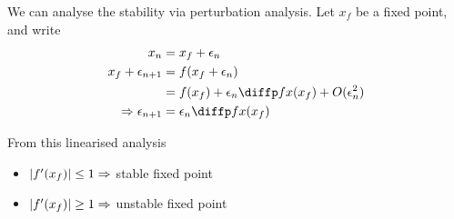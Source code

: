 \documentclass{article}
\begin{document}
We can analyse the stability via perturbation analysis.
Let $x_f$ be a fixed point, and write
\begin{align*}
    x_n &= x_f + \epsilon_n \\
    x_f + \epsilon_{n+1} &= f(x_f + \epsilon_n) \\
    &= f(x_f) + \epsilon_n \diffp f x (x_f) + O(\epsilon_n^2) \\
    \Rightarrow \epsilon_{n+1} &= \epsilon_n \diffp f x (x_f)
\end{align*}

From this linearised analysis
\begin{itemize}
    \item $\left\lvert f'(x_f)\right\rvert \leq 1 \Rightarrow$ stable fixed point
    \item $\left\lvert f'(x_f)\right\rvert \geq 1 \Rightarrow$ unstable fixed point
\end{itemize}
\end{document}
